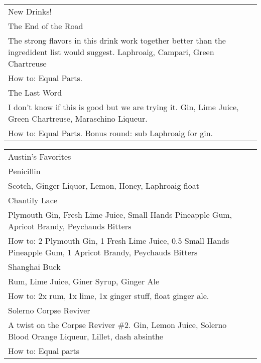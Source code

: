 \documentclass[12pt]{article}
\makeatletter
\newcommand*\ColText[1]{\textcolor{DarkColor}{#1}}
\newenvironment{Group}[1]
  {\noindent\begin{tabular*}{\textwidth}{@{}p{.8\linewidth}@{\extracolsep{\fill}}r@{}}
    {\fontsize{24}{29}\selectfont\ColText{#1}}\\[0.8em]}
  {\end{tabular*}}
\newcommand*\Entry[1]{%
  \sffamily#1 \\
}
\newcommand*\Expl[1]{
  \hspace*{1em}\footnotesize #1 \\
}
\newcommand*\HowTo[1]{
  \hspace*{1em}\footnotesize How to: \hspace*{1em}#1 \\
}
\makeatother
\begin{document}
\iffalse

\begin{Group}{Snow Drinks}

\Entry{Green Circle}
\Expl{Also known as the japanese slipper.}
\HowTo{Equal parts Midori, Cointreau, and lemon juice}

\Entry{Blue Square}
\Expl{A White Lady made with Blue Curaçao.}
\HowTo{4cl gin, 3cl triple sec, 2cl lemon juice}

\Entry{Black Diamond}
\Expl{A glass of fernet.}
\HowTo{Fernet}

\end{Group}

\vfill

\begin{Group}{Winter Drinks}
\Entry{Hot Buttered Rum}

\Entry{Hot Toddy}
\HowTo{Whisky, boiling water, and sugar or honey.}

\Entry{Irish Coffee}
\HowTo{2 parts Irish whiskey, 4 parts hot coffee, 1.5 parts fresh cream, 1 tsp brown sugar}

\Entry{Tom and Jerry}
\end{Group}

\vfill
\fi

\begin{Group}{New Drinks!}

\Entry{The End of the Road}
\Expl{The strong flavors in this drink work together better than the ingredident list would suggest. Laphroaig, Campari, Green Chartreuse}
\HowTo{Equal Parts.}

\Entry{The Last Word}
\Expl{I don't know if this is good but we are trying it. Gin, Lime Juice, Green Chartreuse, Maraschino Liqueur.}
\HowTo{Equal Parts. Bonus round: sub Laphroaig for gin.}

\end{Group}

\vfill

\begin{Group}{Austin's Favorites}

\Entry{Penicillin}
\Expl{Scotch, Ginger Liquor, Lemon, Honey, Laphroaig float}

\Entry{Chantily Lace}
\Expl{Plymouth Gin, Fresh Lime Juice, Small Hands Pineapple Gum, Apricot Brandy, Peychauds Bitters}
\HowTo{2 Plymouth Gin, 1 Fresh Lime Juice, 0.5 Small Hands Pineapple Gum, 1 Apricot Brandy, Peychauds Bitters}

\Entry{Shanghai Buck}
\Expl{Rum, Lime Juice, Giner Syrup, Ginger Ale}
\HowTo{2x rum, 1x lime, 1x ginger stuff, float ginger ale.}

\Entry{Solerno Corpse Reviver}
\Expl{A twist on the Corpse Reviver \#2. Gin, Lemon Juice, Solerno Blood Orange Liqueur, Lillet, dash absinthe}
\HowTo{Equal parts}

\end{Group}
\end{document}
